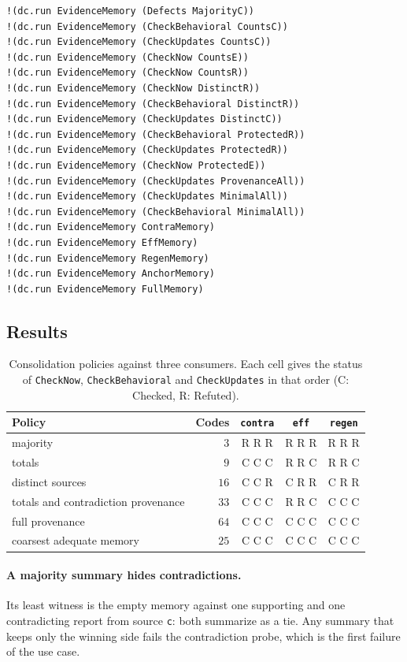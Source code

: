 \documentclass[11pt]{article}
\newcommand{\code}[1]{\texttt{#1}}
\theoremstyle{definition}
\theoremstyle{plain}
\begin{document}
\begin{lstlisting}[style=mettamod]
!(dc.run EvidenceMemory (Defects MajorityC))
!(dc.run EvidenceMemory (CheckBehavioral CountsC))
!(dc.run EvidenceMemory (CheckUpdates CountsC))
!(dc.run EvidenceMemory (CheckNow CountsE))
!(dc.run EvidenceMemory (CheckNow CountsR))
!(dc.run EvidenceMemory (CheckNow DistinctR))
!(dc.run EvidenceMemory (CheckBehavioral DistinctR))
!(dc.run EvidenceMemory (CheckUpdates DistinctC))
!(dc.run EvidenceMemory (CheckBehavioral ProtectedR))
!(dc.run EvidenceMemory (CheckUpdates ProtectedR))
!(dc.run EvidenceMemory (CheckNow ProtectedE))
!(dc.run EvidenceMemory (CheckUpdates ProvenanceAll))
!(dc.run EvidenceMemory (CheckUpdates MinimalAll))
!(dc.run EvidenceMemory (CheckBehavioral MinimalAll))
!(dc.run EvidenceMemory ContraMemory)
!(dc.run EvidenceMemory EffMemory)
!(dc.run EvidenceMemory RegenMemory)
!(dc.run EvidenceMemory AnchorMemory)
!(dc.run EvidenceMemory FullMemory)
\end{lstlisting}

\subsection{Results}

\begin{table}[ht]
\centering\small
\begin{tabular}{lrccc}
\toprule
Policy & Codes & \code{contra} & \code{eff} & \code{regen}\\
\midrule
majority & $3$ & R R R & R R R & R R R\\
totals & $9$ & C C C & R R C & R R C\\
distinct sources & $16$ & C C R & C R R & C R R\\
totals and contradiction provenance & $33$ & C C C & R R C & C C C\\
full provenance & $64$ & C C C & C C C & C C C\\
coarsest adequate memory & $25$ & C C C & C C C & C C C\\
\bottomrule
\end{tabular}
\caption{Consolidation policies against three consumers. Each cell gives the status of
\code{CheckNow}, \code{CheckBehavioral} and \code{CheckUpdates} in that order (C: Checked, R:
Refuted).}\label{tab:p3}
\end{table}

\paragraph{A majority summary hides contradictions.} Its least witness is the empty memory against
one supporting and one contradicting report from source \code{c}: both summarize as a tie. Any
summary that keeps only the winning side fails the contradiction probe, which is the first failure
of the use case.
\end{document}
